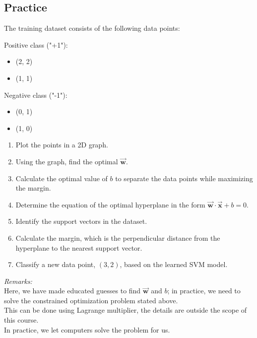 \documentclass[]{article}
\newcommand{\vecx}{ \vec{\mathbf{x}} }
\newcommand{\vecw}{ \vec{\mathbf{w}} }
\begin{document}
	\subsection{Practice}
	The training dataset consists of the following data points:
	
	Positive class ("+1"):
	\begin{itemize}
		\item (2, 2)
		\item (1, 1)
	\end{itemize}
	Negative class ("-1"):
	\begin{itemize}
		\item (0, 1)
		\item (1, 0)
	\end{itemize}
	
	\begin{enumerate}
		\item Plot the points in a 2D graph.
		\item Using the graph, find the optimal $\vecw$.
		\item Calculate the optimal value of \(b\) to separate the data points while maximizing the margin.
		\item Determine the equation of the optimal hyperplane in the form \(\vecw \cdot \vecx + b = 0\).
		\item Identify the support vectors in the dataset.
		\item Calculate the margin, which is the perpendicular distance from the hyperplane to the nearest support vector.
		\item Classify a new data point, \((3, 2)\), based on the learned SVM model.
	\end{enumerate}
	\textit{Remarks:}\\
	Here, we have made educated guesses to find $\vecw$ and $b$; in practice, we need to solve the constrained optimization problem stated above.\\
	This can be done using Lagrange multiplier, the details are outside the scope of this course.\\
	In practice, we let computers solve the problem for us.
	
	
	
\end{document}
